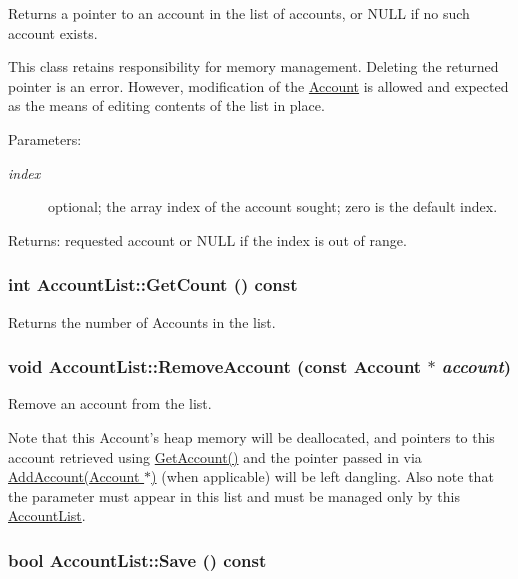 Returns a pointer to an account in the list of accounts, or NULL if no such account exists. 

This class retains responsibility for memory management. Deleting the returned pointer is an error. However, modification of the \hyperlink{classAccount}{Account} is allowed and expected as the means of editing contents of the list in place. \begin{Desc}
\item[Parameters:]
\begin{description}
\item[{\em index}]optional; the array index of the account sought; zero is the default index. \end{description}
\end{Desc}
\begin{Desc}
\item[Returns:]requested account or NULL if the index is out of range. \end{Desc}
\hypertarget{classAccountList_b83a124132b34cf82e5601609776daf9}{
\subsubsection[{GetCount}]{\setlength{\rightskip}{0pt plus 5cm}int AccountList::GetCount () const}}
\label{classAccountList_b83a124132b34cf82e5601609776daf9}


Returns the number of Accounts in the list. 

\hypertarget{classAccountList_16a6b337fc14bce5ee4dd31f854592fc}{
\subsubsection[{RemoveAccount}]{\setlength{\rightskip}{0pt plus 5cm}void AccountList::RemoveAccount (const {\bf Account} $\ast$ {\em account})}}
\label{classAccountList_16a6b337fc14bce5ee4dd31f854592fc}


Remove an account from the list. 

Note that this Account's heap memory will be deallocated, and pointers to this account retrieved using \hyperlink{classAccountList_c3d69942a3a661112f5a141bbbb80909}{GetAccount()} and the pointer passed in via \hyperlink{classAccountList_58880040232e0a6ba7e77096e26b6347}{AddAccount(Account $\ast$)} (when applicable) will be left dangling. Also note that the parameter must appear in this list and must be managed only by this \hyperlink{classAccountList}{AccountList}. \hypertarget{classAccountList_f070ee0999c8406ed4c79ba4e131545a}{
\subsubsection[{Save}]{\setlength{\rightskip}{0pt plus 5cm}bool AccountList::Save () const}}
\label{classAccountList_f070ee0999c8406ed4c79ba4e131545a}


